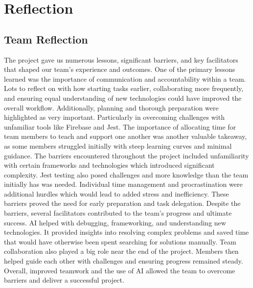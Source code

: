 \clearpage
\section{Reflection}

\subsection{Team Reflection}
The project gave us numerous lessons, significant barriers, and key facilitators that shaped our team’s experience and outcomes. One of the primary lessons learned was the importance of communication and accountability within a team. Lots to reflect on with how starting tasks earlier, collaborating more frequently, and ensuring equal understanding of new technologies could have improved the overall workflow. Additionally, planning and thorough preparation were highlighted as very important. Particularly in overcoming challenges with  unfamiliar tools like Firebase and Jest. The importance of allocating time for team members to teach and support one another was another valuable takeaway, as some members struggled initially with steep learning curves and minimal guidance. The barriers encountered throughout the project included unfamiliarity with certain frameworks and technologies which introduced significant complexity. Jest testing also posed challenges and more knowledge than the team initially has was needed. Individual time management and procrastination were additional hurdles which would lead to added stress and inefficiency. These barriers proved the need for early preparation and task delegation. Despite the barriers, several facilitators contributed to the team’s progress and ultimate success. AI helped with debugging, frameworking, and understanding new technologies. It provided insights into resolving complex problems and saved time that would have otherwise been spent searching for solutions manually. Team collaboration also played a big role near the end of the project. Members then helped guide each other with challenges and ensuring progress remained steady.  Overall, improved teamwork and the use of AI allowed the team to overcome barriers and deliver a successful project.

